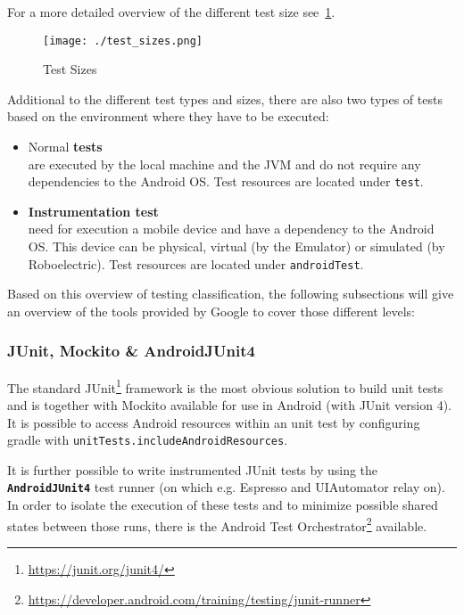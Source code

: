 For a more detailed overview of the different test size see~\ref{fig_google_test_sizes}.

\begin{figure}[htb]
	\centering
	\texttt{[image: ./test\_sizes.png]}
	\caption[Test Sizes]{Test Sizes\footnotemark}
	\label{fig_google_test_sizes}
\end{figure}

Additional to the different test types and sizes, there are also two types of tests based on the environment where they have to be executed:

\begin{itemize}
	\item Normal \textbf{tests}\\
	are executed by the local machine and the JVM and do not require any dependencies to the Android OS. Test resources are located under \texttt{test}.
	\item \textbf{Instrumentation test} \\
	need for execution a mobile device and have a dependency to the Android OS. This device can be physical, virtual (by the Emulator) or simulated (by Roboelectric). Test resources are located under \texttt{androidTest}.
\end{itemize}

Based on this overview of testing classification, the following subsections will give an overview of the tools provided by Google to cover those different levels:

\subsubsection{JUnit, Mockito \& AndroidJUnit4}
The standard JUnit\footnote{\url{https://junit.org/junit4/}} framework is the most obvious solution to build unit tests and is together with Mockito available for use in Android (with JUnit version 4). It is possible to access Android resources within an unit test by configuring gradle with \texttt{unitTests.includeAndroidResources}.

It is further possible to write instrumented JUnit tests by using the \textbf{\texttt{AndroidJUnit4}} test runner (on which e.g. Espresso and UIAutomator relay on). In order to isolate the execution of these tests and to minimize possible shared states between those runs, there is the Android Test Orchestrator\footnote{\url{https://developer.android.com/training/testing/junit-runner}} available.

